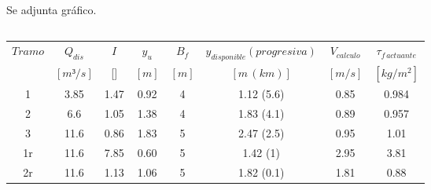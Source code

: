 \documentclass[10.5pt]{article}
\begin{document}
\subsection{}

Se adjunta gráfico.

\subsection{}
 
   \begin{table}[H]
    \large        %
    \centering    %
    \begin{tabular}{|c|c|c|c|c|c|c|c|}
    \hline
    $Tramo$  	&$Q_{dis}$  	&$I$  			&$y_{u}$	&$B_{f}$	&$y_{disponible} (progresiva)$  	&$V_{calculo}$  &$\tau_{f\,actuante}$ \\     %
		&$[m³/s]$  	&[\textperthousand] 	&$[m]$		&$[m]$		&$[m\,(km)]$  				&$[m/s]$	&$[kg/m^2]$ \\     %
    \hline
    1		&3.85			&1.47	&0.92	  &4		&1.12 (5.6)			&0.85		&0.984\\
    \hline
    2		&6.6			&1.05	&1.38	  &4		&1.83 (4.1)			&0.89		&0.957\\
    \hline
    3		&11.6			&0.86	&1.83	  &5		&2.47 (2.5)			&0.95		&1.01\\
    \hline
    1r		&11.6			&7.85	&0.60	  &5		&1.42 (1)			&2.95		&3.81\\
    \hline
    2r		&11.6	&1.13	&1.06	  &5	&1.82 (0.1)	&1.81	&0.88\\
    \hline        %
    \end{tabular}
  \end{table}



























 
\end{document}
